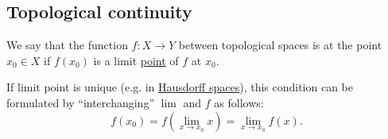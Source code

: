 \subsection{Topological continuity}\label{subsec:topological_continuity}

\begin{definition}\label{def:local_continuity}
  We say that the function \( f: X \to Y \) between topological spaces is  at the point \( x_0 \in X \) if \( f(x_0) \) is a limit \hyperref[def:local_convergence]{point} of \( f \) at \( x_0 \).

  If limit point is unique (e.g. in \hyperref[def:separation_axioms/T2]{Hausdorff spaces}), this condition can be formulated by \enquote{interchanging} \( \lim \) and \( f \) as follows:
  \begin{equation*}
    f(x_0) = f\left( \lim_{x \to x_0} x \right) = \lim_{x \to x_0} f(x).
  \end{equation*}
\end{definition}

